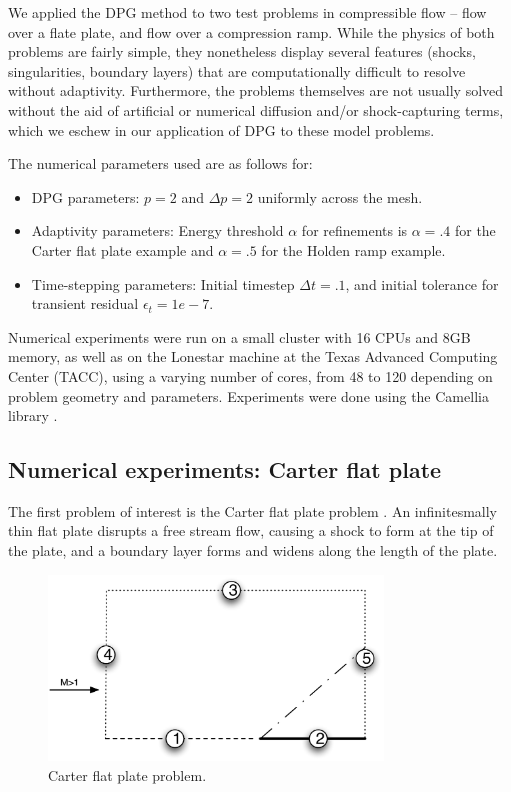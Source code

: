 We applied the DPG method to two test problems in compressible flow -- flow over a flate plate, and flow over a compression ramp.  While the physics of both problems are fairly simple, they nonetheless display several features (shocks, singularities, boundary layers) that are computationally difficult to resolve without adaptivity.  Furthermore, the problems themselves are not usually solved without the aid of artificial or numerical diffusion and/or shock-capturing terms, which we eschew in our application of DPG to these model problems.

The numerical parameters used are as follows for:
\begin{itemize}
\item{DPG parameters:} $p = 2$ and $\Delta p = 2$ uniformly across the mesh. 
\item{Adaptivity parameters:} Energy threshold $\alpha$ for refinements is $\alpha = .4$ for the Carter flat plate example and $\alpha = .5$ for the Holden ramp example.  
\item{Time-stepping parameters:} Initial timestep $\Delta t = .1$, and initial tolerance for transient residual $\epsilon_t = 1e-7$.
\end{itemize}

Numerical experiments were run on a small cluster with 16 CPUs and 8GB memory, as well as on the Lonestar machine at the Texas Advanced Computing Center (TACC), using a varying number of cores, from 48 to 120 depending on problem geometry and parameters.  Experiments were done using the Camellia library \cite{Camellia}.

\subsection{Numerical experiments: Carter flat plate}

The first problem of interest is the Carter flat plate problem \cite{Carter}. An infinitesmally thin flat plate disrupts a free stream flow, causing a shock to form at the tip of the plate, and a boundary layer forms and widens along the length of the plate.  

\begin{figure}
\centering
\includegraphics[width=3.5in]{flat_plate_BCs.pdf}
\caption{Carter flat plate problem.}
\end{figure}


